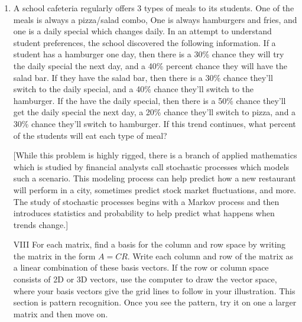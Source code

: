 \documentclass[10pt]{amsart}
\begin{document}
\begin{multicols}{2}
\begin{enumerate}
\item A school cafeteria regularly offers 3 types of meals to its students. One of the meals is always a pizza/salad combo, One is always hamburgers and fries, and one is a daily special which changes daily. In an attempt to understand student preferences, the school discovered the following information. If a student has a hamburger one day, then there is a 30\% chance they will try the daily special the next day, and a 40\% percent chance they will have the salad bar.  If they have the salad bar, then there is a 30\% chance they'll switch to the daily special, and a 40\% chance they'll switch to the hamburger.  If the have the daily special, then there is a 50\% chance they'll get the daily special the next day, a 20\% chance they'll switch to pizza, and a 30\% chance they'll switch to hamburger.  If this trend continues, what percent of the students will eat each type of meal? 

[While this problem is highly rigged, there is a branch of applied mathematics which is studied by financial analysts call stochastic processes which models such a scenario. This modeling process can help predict how a new restaurant will perform in a city, sometimes predict stock market fluctuations, and more. The study of stochastic processes begins with a Markov process and then introduces statistics and probability to help predict what happens when trends change.]





\vspace{.3in}
\item[VIII] For each matrix, find a basis for the column and row space by writing the matrix in the form $A=CR$. Write each column and row of the matrix as a linear combination of these basis vectors. If the row or column space consists of 2D or 3D vectors, use the computer to draw the vector space, where your basis vectors give the grid lines to follow in your illustration. This section is pattern recognition. Once you see the pattern, try it on one a larger matrix and then move on.



\end{enumerate}
\end{multicols}
\end{document}
